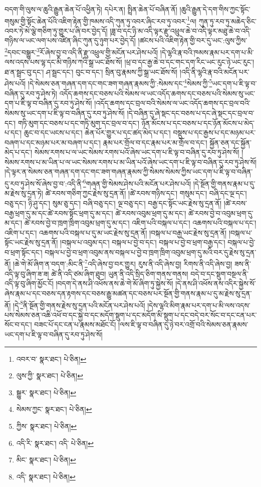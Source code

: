 བདག་གི་ལུས་ལ་ཆུའི་རྒྱུན་ཆེན་པོ་འཕྱིན་ཏེ། དཔེར་ན། སྤྲིན་ཆེན་པོ་བཞིན་ནོ། །ཆུའི་རྒྱུན་དེ་དག་གིས་ཀྱང་སྟོང་གསུམ་གྱི་སྟོང་ཆེན་པོའི་འཇིག་རྟེན་གྱི་ཁམས་འདི་ཀུན་ཏུ་འབར་ཞིང་རབ་ཏུ་འབར་\footnote{འབར་བ་  སྣར་ཐང་།  པེ་ཅིན། }ལ། ཀུན་ཏུ་རབ་ཏུ་མཆེད་ཅིང་འབར་ཏེ་མེ་ལྕེ་གཅིག་ཏུ་གྱུར་པ་ཞི་བར་བྱེད་དོ། །ཟླ་བ་དང་ཉི་མ་འདི་ལྟར་རྫུ་འཕྲུལ་ཆེ་བ་འདི་ལྟར་མཐུ་ཆེ་བ་འདི་གཉིས་ལ་ཡང་ལག་པས་འཛིན་ཞིང་ཀུན་དུ་ཉུག་པར་བྱེད་དོ། །ཚངས་པའི་འཇིག་རྟེན་གྱི་བར་དུ་ཡང་:ལུས་ཀྱིས་\footnote{ལུས་ཀྱི་  སྣར་ཐང་།  པེ་ཅིན། }དབང་བསྒྱུར་\footnote{སྒྱུར་  སྣར་ཐང་།  པེ་ཅིན། }རོ་ཞེས་བྱ་བ་འདི་ནི་རྫུ་འཕྲུལ་གྱི་མངོན་པར་ཤེས་པའོ། །དེ་ལྷའི་རྣ་བའི་ཁམས་རྣམ་པར་དག་པ་མི་ལས་འདས་པས་ལྷ་དང་མི་གཉིས་ཀའི་སྒྲ་ཡང་ཐོས་སོ། །ཕྲ་བ་དང་རྒྱ་ཆེ་བ་དང་གང་དག་རིང་ཡང་རུང་ཉེ་ཡང་རུང་། ཐ་ན་སྦྲང་བུ་དང་། ཤ་སྦྲང་དང་། བུང་བ་དང་། སྲིན་བུ་རྣམས་ཀྱི་སྒྲ་ཡང་ཐོས་སོ། །འདི་ནི་ལྷའི་རྣ་བའི་མངོན་པར་ཤེས་པའོ། །དེ་སེམས་ཅན་གཞན་དག་དང་གང་ཟག་གཞན་རྣམས་ཀྱི་:སེམས་དང་\footnote{སེམས་ཀྱང་  སྣར་ཐང་།  པེ་ཅིན། }སེམས་ཀྱི་\footnote{ཀྱིས་  སྣར་ཐང་།  པེ་ཅིན། }ཡང་དག་པ་ཇི་ལྟ་བ་བཞིན་དུ་རབ་ཏུ་ཤེས་ཏེ། འདོད་ཆགས་དང་བཅས་པའི་སེམས་ལ་ཡང་འདོད་ཆགས་དང་བཅས་པའི་སེམས་སུ་ཡང་དག་པ་ཇི་ལྟ་བ་བཞིན་དུ་རབ་ཏུ་ཤེས་སོ། །འདོད་ཆགས་དང་བྲལ་བའི་སེམས་ལ་ཡང་འདོད་ཆགས་དང་བྲལ་བའི་སེམས་སུ་ཡང་དག་པ་ཇི་ལྟ་བ་བཞིན་དུ་རབ་ཏུ་ཤེས་སོ། །དེ་བཞིན་དུ་ཞེ་སྡང་དང་བཅས་པ་དང་ཞེ་སྡང་དང་བྲལ་བ་དང་། གཏི་མུག་དང་བཅས་པ་དང་གཏི་མུག་དང་བྲལ་བ་དང་། ཉོན་མོངས་པ་དང་བཅས་པ་དང་ཉོན་མོངས་པ་མེད་པ་དང་། ཆུང་བ་དང་ཡངས་པ་དང་། ཆེན་པོར་གྱུར་པ་དང་ཚད་མེད་པ་དང་། བསྡུས་པ་དང་རྒྱས་པ་དང་མཉམ་པར་བཞག་པ་དང་མཉམ་པར་མ་བཞག་པ་དང་། རྣམ་པར་གྲོལ་བ་དང་རྣམ་པར་མ་གྲོལ་བ་དང་། སྐྱོན་ཅན་དང་སྐྱོན་མེད་པ་དང་། སེམས་རགས་པ་ལ་ཡང་སེམས་རགས་པའོ་ཞེས་ཡང་དག་པ་ཇི་ལྟ་བ་བཞིན་དུ་རབ་ཏུ་ཤེས་སོ། །སེམས་རགས་པ་མ་ཡིན་པ་ལ་ཡང་སེམས་རགས་པ་མ་ཡིན་པའོ་ཞེས་ཡང་དག་པ་ཇི་ལྟ་བ་བཞིན་དུ་རབ་ཏུ་ཤེས་སོ། །དེ་ལྟར་ན་སེམས་ཅན་གཞན་དག་དང་གང་ཟག་གཞན་རྣམས་ཀྱི་སེམས་སེམས་ཀྱིས་ཡང་དག་པ་ཇི་ལྟ་བ་བཞིན་དུ་རབ་ཏུ་ཤེས་སོ་ཞེས་བྱ་བ་:འདི་ནི་\footnote{འདི་རི་  སྣར་ཐང་། འདི་  པེ་ཅིན། }གཞན་གྱི་སེམས་ཤེས་པའི་མངོན་པར་ཤེས་པའོ། །དེ་སྔོན་གྱི་གནས་རྣམ་པ་དུ་མ་རྗེས་སུ་དྲན་ཏེ། ཚེ་རབས་གཅིག་ཀྱང་རྗེས་སུ་དྲན་ནོ། །ཚེ་རབས་གཉིས་དང་། གསུམ་དང་། བཞི་དང་ལྔ་དང་། བཅུ་དང་། ཉི་ཤུ་དང་། སུམ་ཅུ་དང་། བཞི་བཅུ་དང་། ལྔ་བཅུ་དང་། བརྒྱ་དང་སྟོང་ཡང་རྗེས་སུ་དྲན་ནོ། །ཚེ་རབས་བརྒྱ་ཕྲག་དུ་མ་དང་ཚེ་རབས་སྟོང་ཕྲག་དུ་མ་དང་། ཚེ་རབས་འབུམ་ཕྲག་དུ་མ་དང་། ཚེ་རབས་བྱེ་བ་འབུམ་ཕྲག་དུ་མ་དང་། ཚེ་རབས་བྱེ་བ་ཁྲག་ཁྲིག་འབུམ་ཕྲག་དུ་མ་དང་། འཇིག་པའི་བསྐལ་པ་དང་། འཆགས་པའི་བསྐལ་པ་དང་། འཇིག་པ་དང་། འཆགས་པའི་བསྐལ་པ་དུ་མ་ཡང་རྗེས་སུ་དྲན་ནོ། །བསྐལ་པ་བརྒྱ་ཡང་རྗེས་སུ་དྲན་ནོ། །བསྐལ་པ་སྟོང་ཡང་རྗེས་སུ་དྲན་ནོ། །བསྐལ་པ་འབུམ་དང་། བསྐལ་པ་བྱེ་བ་དང་། བསྐལ་པ་བྱེ་བ་ཕྲག་བརྒྱ་དང་། བསྐལ་པ་བྱེ་བ་ཕྲག་སྟོང་དང་། བསྐལ་པ་བྱེ་བ་ཕྲག་འབུམ་ནས་བསྐལ་པ་བྱེ་བ་ཁྲག་ཁྲིག་འབུམ་ཕྲག་དུ་མའི་བར་དུ་རྗེས་སུ་དྲན་ནོ། །ཆེ་གེ་མོ་ཞིག་ན་བདག་:མིང་ནི་\footnote{མིང་  སྣར་ཐང་།  པེ་ཅིན། }འདི་ཞེས་བྱ་བར་གྱུར། རུས་ནི་འདི་ཞེས་བྱ། རིགས་ནི་འདི་ཞེས་བྱ། ཟས་ནི་འདི་ལྟ་བུ་ཞིག་ཟ་ཟ། ཚེ་ནི་འདི་ཙམ་ཞིག་ཐུབ། ཡུན་ནི་འདི་སྲིད་ཅིག་གནས་གནས། བདེ་བ་དང་སྡུག་བསྔལ་ནི་འདི་ལྟ་བུ་ཞིག་མྱོང་ངོ། །བདག་དེ་ནས་ཤི་འཕོས་ནས་ཆེ་གེ་མོ་ཞིག་ཏུ་སྐྱེས་སོ། །དེ་ནས་ཤི་འཕོས་ནས་འདིར་སྐྱེས་སོ་ཞེས་རྣམ་པ་དང་བཅས་དན་རྟགས་དང་བཅས་རྒྱུ་མཚན་དང་བཅས་པར་སྔོན་གྱི་གནས་རྣམ་པ་དུ་མ་རྗེས་སུ་དྲན་ནོ། །དེ་\footnote{འདི་  སྣར་ཐང་།  པེ་ཅིན། }ནི་སྔོན་གྱི་གནས་རྗེས་སུ་དྲན་པའི་མངོན་པར་ཤེས་པའོ། །དེས་ལྷའི་མིག་རྣམ་པར་དག་པ་མི་ལས་འདས་པས་སེམས་ཅན་འཆི་འཕོ་བ་དང་སྐྱེ་བ་དང་མདོག་སྡུག་པ་དང་མདོག་མི་སྡུག་པ་དང་བདེ་བར་སོང་བ་དང་ངན་པར་སོང་བ་དང་། བཟང་པོ་དང་ངན་པ་རྣམས་མཐོང་ངོ། །ལས་ཇི་ལྟ་བ་བཞིན་དུ་ཉེ་བར་འགྲོ་བའི་སེམས་ཅན་རྣམས་ཡང་དག་པ་ཇི་ལྟ་བ་བཞིན་དུ་རབ་ཏུ་ཤེས་སོ། 